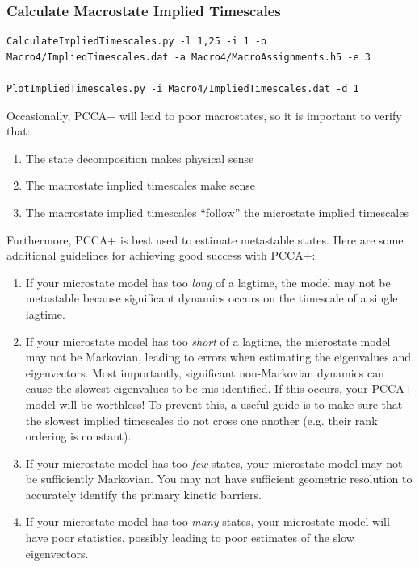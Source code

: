 \documentclass[12pt]{article}
\begin{document}
\subsubsection{Calculate Macrostate Implied Timescales}

\begin{verbatim}
CalculateImpliedTimescales.py -l 1,25 -i 1 -o Macro4/ImpliedTimescales.dat -a Macro4/MacroAssignments.h5 -e 3

PlotImpliedTimescales.py -i Macro4/ImpliedTimescales.dat -d 1
\end{verbatim}

Occasionally, PCCA+ will lead to poor macrostates, so it is important to verify that:

\begin{enumerate}
 \item The state decomposition makes physical sense
 \item The macrostate implied timescales make sense
 \item The macrostate implied timescales ``follow'' the microstate implied timescales
\end{enumerate}

Furthermore, PCCA+ is best used to estimate metastable states.  Here are some additional guidelines for achieving good success with PCCA+:

\begin{enumerate}
 \item If your microstate model has too \emph{long} of a lagtime, the model may not be metastable because significant dynamics occurs on the timescale of a single lagtime. 
 \item If your microstate model has too \emph{short} of a lagtime, the microstate model may not be Markovian, leading to errors when estimating the eigenvalues and eigenvectors.  Most importantly, significant non-Markovian dynamics can cause the slowest eigenvalues to be mis-identified.  If this occurs, your PCCA+ model will be worthless!  To prevent this, a useful guide is to make sure that the slowest implied timescales do not cross one another (e.g. their rank ordering is constant).  
 \item If your microstate model has too \emph{few} states, your microstate model may not be sufficiently Markovian.  You may not have sufficient geometric resolution to accurately identify the primary kinetic barriers.
 \item If your microstate model has too \emph{many} states, your microstate model will have poor statistics, possibly leading to poor estimates of the slow eigenvectors. 
\end{enumerate}
\end{document}
